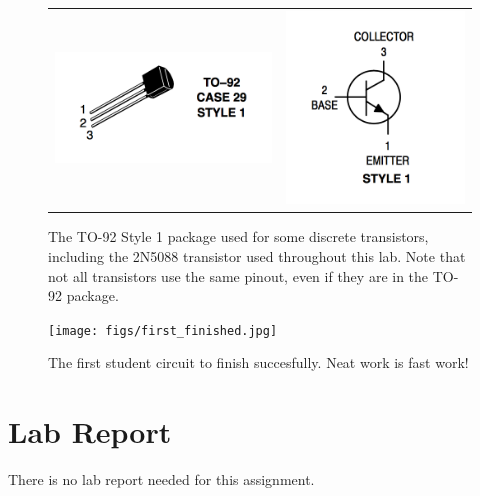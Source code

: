 \documentclass[12pt]{article}
\begin{document}
\begin{figure}[htbp]
\begin{center}
\begin{tabular}{c@{\hskip 2cm}c}
\includegraphics[height=0.10\textheight]{figs/case3904.png} &
\includegraphics[height=0.18\textheight]{figs/chan3904.png} \\
\end{tabular}
\end{center}
\caption{The TO-92 Style 1 package used for some discrete transistors, including the 2N5088 transistor used throughout this lab.  Note that not all transistors use the same pinout, even if they are in the TO-92 package.}
\label{fig:layout}
\end{figure}

\begin{figure}[htbp]
\begin{center}
\texttt{[image: figs/first\_finished.jpg]} 
\end{center}
\caption{The first student circuit to finish succesfully.  Neat work is fast work!}
\label{fig:layout}
\end{figure}


\section{Lab Report}
There is no lab report needed for this assignment. 
\end{document}

